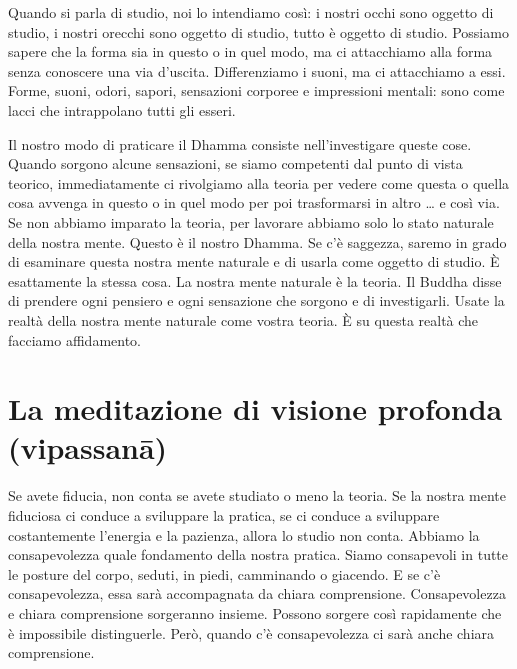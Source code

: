 Quando si parla di studio, noi lo intendiamo così: i nostri occhi sono
oggetto di studio, i nostri orecchi sono oggetto di studio, tutto è
oggetto di studio. Possiamo sapere che la forma sia in questo o in quel
modo, ma ci attacchiamo alla forma senza conoscere una via d'uscita.
Differenziamo i suoni, ma ci attacchiamo a essi. Forme, suoni, odori,
sapori, sensazioni corporee e impressioni mentali: sono come lacci che
intrappolano tutti gli esseri.

Il nostro modo di praticare il Dhamma consiste nell'investigare queste
cose. Quando sorgono alcune sensazioni, se siamo competenti dal punto di
vista teorico, immediatamente ci rivolgiamo alla teoria per vedere come
questa o quella cosa avvenga in questo o in quel modo per poi
trasformarsi in altro \ldots{} e così via. Se non abbiamo imparato la teoria,
per lavorare abbiamo solo lo stato naturale della nostra mente. Questo è
il nostro Dhamma. Se c'è saggezza, saremo in grado di esaminare questa
nostra mente naturale e di usarla come oggetto di studio. È esattamente
la stessa cosa. La nostra mente naturale è la teoria. Il Buddha disse di
prendere ogni pensiero e ogni sensazione che sorgono e di investigarli.
Usate la realtà della nostra mente naturale come vostra teoria. È su
questa realtà che facciamo affidamento.

\section{La meditazione di visione profonda (vipassanā)}


Se avete fiducia, non conta se avete studiato o meno la teoria. Se la
nostra mente fiduciosa ci conduce a sviluppare la pratica, se ci conduce
a sviluppare costantemente l'energia e la pazienza, allora lo studio non
conta. Abbiamo la consapevolezza quale fondamento della nostra pratica.
Siamo consapevoli in tutte le posture del corpo, seduti, in piedi,
camminando o giacendo. E se c'è consapevolezza, essa sarà accompagnata
da chiara comprensione. Consapevolezza e chiara comprensione sorgeranno
insieme. Possono sorgere così rapidamente che è impossibile
distinguerle. Però, quando c'è consapevolezza ci sarà anche chiara
comprensione.

